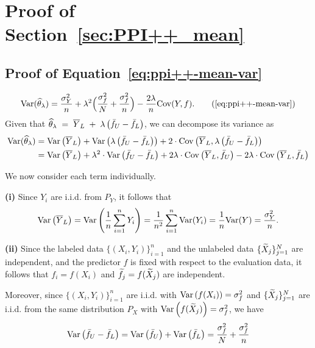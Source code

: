 \section{Proof of Section~\ref{sec:PPI++_mean}}
\subsection{Proof of Equation~\eqref{eq:ppi++-mean-var}}
\begin{equation}
\Var(\wh\theta_\lambda)
=
\frac{\sigma_Y^2}{n}
+\lambda^2\Big(\frac{\sigma_f^2}{N}+\frac{\sigma_f^2}{n}\Big)
-\frac{2\lambda}{n}\Cov(Y,f).
\tag{\ref{eq:ppi++-mean-var}}
\end{equation}
Given that $\widehat\theta_\lambda \;=\; \overline Y_L \;+\; \lambda\,\big(\bar f_U - \bar f_L\big)$, we can decompose its variance as
\begin{align*}
\mathrm{Var}(\widehat\theta_\lambda)
&=\mathrm{Var}\left(\overline{Y}_L\right)
+\mathrm{Var}\left(\lambda\,\big(\bar f_U - \bar f_L\big)\right)
+2\cdot\mathrm{Cov}\left(\overline{Y}_L,\lambda\,\big(\bar f_U - \bar f_L\big)\right)\\
&=\mathrm{Var}\left(\overline{Y}_L\right)
+\lambda^2\cdot\mathrm{Var}\left(\bar f_U - \bar f_L\right)
+2\lambda\cdot \mathrm{Cov}\left(\overline{Y}_L,\bar f_U\right)
-2\lambda\cdot \mathrm{Cov}\left(\overline{Y}_L,\bar f_L\right)
\end{align*}

\noindent
We now consider each term individually. 

\noindent
\textbf{(i)} Since $Y_i$ are i.i.d. from $P_Y$, it follows that
\begin{align*}
    \mathrm{Var}\left(\overline{Y}_L\right)
    =\mathrm{Var}\left(\frac{1}{n}\sum^n_{i=1}Y_i\right)
    =\frac{1}{n^2}\sum^n_{i=1}\mathrm{Var}(Y_i)
    =\frac{1}{n}\mathrm{Var}(Y)
    =\frac{\sigma_Y^2}{n}.
\end{align*}

\noindent
\textbf{(ii)} Since the labeled data $\{(X_i, Y_i)\}_{i=1}^n$ and the unlabeled data $\{\widetilde {X}_j\}_{j=1}^N$ are independent, and the predictor $f$ is fixed with respect to the evaluation data, it follows that $f_i = f(X_i)$ and $\widetilde{f}_j = f(\widetilde{X}_j)$ are independent.

\noindent
Moreover, since $\{(X_i, Y_i)\}_{i=1}^n$ are i.i.d. with $\mathrm{Var}\left(f( X_i)\right)=\sigma_f^2$ and $\{\widetilde {X}_j\}_{j=1}^N$ are i.i.d. from the same distribution $P_X$ with $\mathrm{Var}\left(f(\widetilde X_j)\right)=\sigma_f^2$, we have \begin{align*}
    \mathrm{Var}\left(\bar f_U-\bar f_L\right)
    =\mathrm{Var}\left(\bar f_U\right)+\mathrm{Var}\left(\bar f_L\right)
    =\frac{\sigma^2_f}{N}+\frac{\sigma_f^2}{n}
\end{align*}

